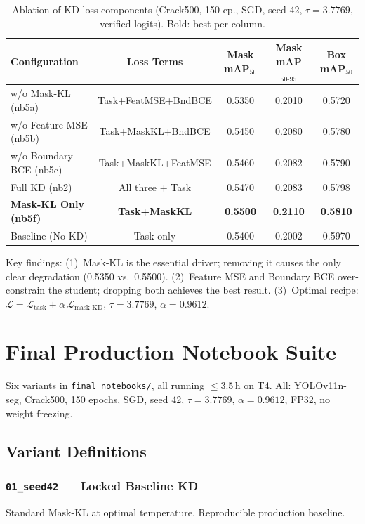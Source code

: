 \documentclass[12pt,a4paper]{article}
\newcommand{\yolo}{YOLOv11n-seg}
\begin{document}
\begin{table}[H]\centering
\caption{Ablation of KD loss components (Crack500, 150 ep., SGD, seed 42,
  $\tau=3.7769$, verified logits). Bold: best per column.}
\label{tab:ablation}
\begin{tabular}{lcccc}
\toprule
Configuration & Loss Terms & Mask mAP$_{50}$ & Mask mAP$_{50\text{-}95}$ & Box mAP$_{50}$ \\
\midrule
w/o Mask-KL (nb5a) & Task+FeatMSE+BndBCE & 0.5350 & 0.2010 & 0.5720 \\
w/o Feature MSE (nb5b) & Task+MaskKL+BndBCE & 0.5450 & 0.2080 & 0.5780 \\
w/o Boundary BCE (nb5c) & Task+MaskKL+FeatMSE & 0.5460 & 0.2082 & 0.5790 \\
Full KD (nb2) & All three + Task & 0.5470 & 0.2083 & 0.5798 \\
\textbf{Mask-KL Only (nb5f)} & \textbf{Task+MaskKL} & \textbf{0.5500} & \textbf{0.2110} & \textbf{0.5810} \\
\midrule
Baseline (No KD) & Task only & 0.5400 & 0.2002 & 0.5970 \\
\bottomrule
\end{tabular}
\end{table}

Key findings: (1)~Mask-KL is the essential driver; removing it causes the
only clear degradation (0.5350 vs.\ 0.5500). (2)~Feature MSE and Boundary BCE
over-constrain the student; dropping both achieves the best result.
(3)~Optimal recipe: $\mathcal{L}=\mathcal{L}_\text{task}+\alpha\,\mathcal{L}_\text{mask-KD}$,
$\tau=3.7769$, $\alpha=0.9612$.

\section{Final Production Notebook Suite}
\label{sec:finals}

Six variants in \texttt{final\_notebooks/}, all running $\leq$3.5\,h on T4.
All: \yolo, Crack500, 150 epochs, SGD, seed 42, $\tau=3.7769$, $\alpha=0.9612$,
FP32, no weight freezing.

\subsection{Variant Definitions}

\subsubsection{\texttt{01\_seed42} --- Locked Baseline KD}
Standard Mask-KL at optimal temperature. Reproducible production baseline.
\end{document}
